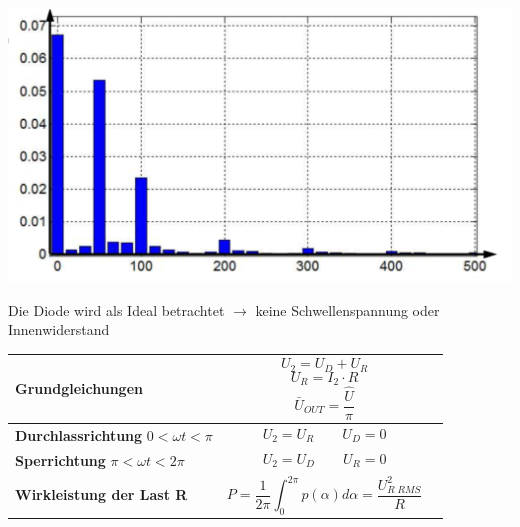 \begin{minipage}{0.3\linewidth}
    \includegraphics[width=\linewidth]{images/UGM1OW} 
\end{minipage}
\newline

Die Diode wird als Ideal betrachtet $ \rightarrow $ keine Schwellenspannung oder Innenwiderstand
\begin{longtable}{| p{} | p{} | p{} |} %
    \hline
    \textbf{Grundgleichungen}&
    \[ U_2 = U_D + U_R \]
    \[ U_R = I_2 \cdot R\]
    \[ \bar{U}_{OUT} = \dfrac{\hat{U}}{\pi}\]&\\
    \hline
    \textbf{Durchlassrichtung}\newline
    $ 0 < \omega t < \pi $&
    \vspace{-0.3cm}\[ U_2 = U_R \qquad U_D = 0 \] \vspace{-0.3cm}&\\
    \hline   
    \textbf{Sperrichtung}\newline
    $ \pi < \omega t < 2\pi $&
     \vspace{-0.3cm}\[ U_2=U_D \qquad U_R = 0 \] \vspace{-0.3cm}&\\
    \hline
    
    \textbf{Wirkleistung der Last R}&
    \[ P=\frac{1}{2\pi} \int_{0}^{2\pi} p(\alpha) d\alpha = \dfrac{U_{R\;RMS}^2}{R} \]&
    \\ \hline
%    
%        
%    
%        

\end{longtable}

